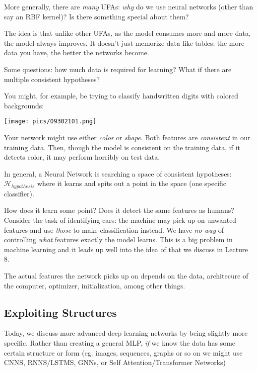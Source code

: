 \documentclass[11pt]{scrartcl}
\begin{document}
More generally, there are \textit{many} UFAs: \textit{why} do we use neural networks (other than say an RBF kernel)? Is there something special about them? 

The idea is that unlike other UFAs, as the model consumes more and more data, the model always improves. It doesn't just memorize data like tables: the more data you have, the better the networks become. 

Some questions: how much data is required for learning? What if there are multiple consistent hypotheses?
 
\begin{ex}
You might, for example, be trying to classify handwritten digits with colored backgrounds:
\begin{center}
    \texttt{[image: pics/09302101.png]}
\end{center}
Your network might use either \textit{color} or \textit{shape}. Both features are \textit{consistent} in our training data. Then, though the model is consistent on the training data, if it detects color, it may perform horribly on test data. 
\end{ex}
In general, a Neural Network is searching a space of consistent hypotheses: $\mathcal{H}_{hypothesis}$ where it learns and spits out a point in the space (one specific classifier). 

How does it learn some point? Does it detect the same features as humans? Consider the task of identifying cars: the machine may pick up on unwanted features and use \textit{those} to make classification instead. We have \textit{no way} of controlling \textit{what} features exactly the model learns. This is a big problem in machine learning and it leads up well into the idea of  that we discuss in Lecture 8. 

The actual features the network picks up on depends on the data, architecure of the computer, optimizer, initialization, among other things. 

\subsection{Exploiting Structures}
Today, we discuss more advanced deep learning networks by being slightly more specific. Rather than creating a general MLP, \textit{if} we know the data has some certain structure or form (eg. images, sequences, graphs or so on we might use CNNS, RNNS/LSTMS, GNNs, or Self Attention/Transformer Networks)
\end{document}
